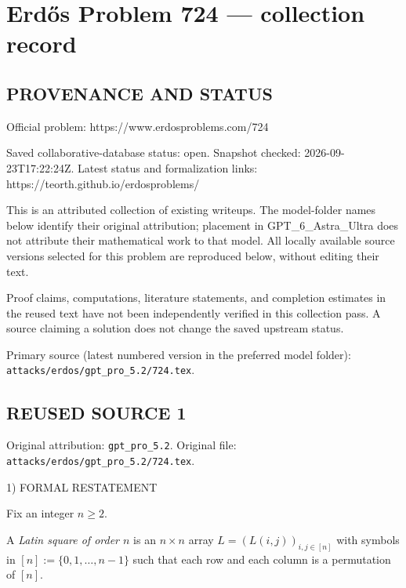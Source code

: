 \section*{Erd\H{o}s Problem 724 --- collection record}

\subsection*{PROVENANCE AND STATUS}
Official problem: https://www.erdosproblems.com/724

Saved collaborative-database status: open.
Snapshot checked: 2026-09-23T17:22:24Z.
Latest status and formalization links: https://teorth.github.io/erdosproblems/

This is an attributed collection of existing writeups. The model-folder names below identify their original attribution; placement in GPT\_6\_Astra\_Ultra does not attribute their mathematical work to that model. All locally available source versions selected for this problem are reproduced below, without editing their text.

Proof claims, computations, literature statements, and completion estimates in the reused text have not been independently verified in this collection pass. A source claiming a solution does not change the saved upstream status.

Primary source (latest numbered version in the preferred model folder): \texttt{attacks/erdos/gpt\_pro\_5.2/724.tex}.

\subsection*{REUSED SOURCE 1}
Original attribution: \texttt{gpt\_pro\_5.2}.
Original file: \texttt{attacks/erdos/gpt\_pro\_5.2/724.tex}.


1) FORMAL RESTATEMENT

Fix an integer $n\ge 2$.

A \emph{Latin square of order $n$} is an $n\times n$ array $L=(L(i,j))_{i,j\in[n]}$ with symbols in $[n]:=\{0,1,\dots,n-1\}$ such that each row and each column is a permutation of $[n]$.

